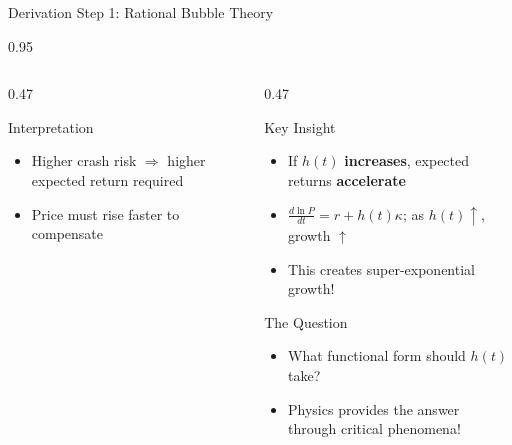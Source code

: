 \documentclass[9pt, aspectratio=169, t]{beamer}
\begin{document}
\begin{frame}{Derivation Step 1: Rational Bubble Theory}
\begin{cminipage}{0.95\textwidth}
{\begin{columns}[T]
\begin{column}{0.47\textwidth}
            \begin{exampleblock}{Interpretation}
                \begin{itemize}\setlength{\itemsep}{0pt}
                    \item Higher crash risk $\Rightarrow$ higher expected return required
                    \item Price must rise faster to compensate
                \end{itemize}
            \end{exampleblock}
        \end{column}
        \begin{column}{0.47\textwidth}
            \begin{alertblock}{Key Insight}
                \begin{itemize}\setlength{\itemsep}{0pt}
                    \item If $h(t)$ \textbf{increases}, expected returns \textbf{accelerate}
                    \item $\frac{d\ln P}{dt} = r + h(t)\kappa$; as $h(t) \uparrow$, growth $\uparrow$
                    \item This creates super-exponential growth!
                \end{itemize}
            \end{alertblock}

            \begin{block}{The Question}
                \begin{itemize}\setlength{\itemsep}{0pt}
                    \item What functional form should $h(t)$ take?
                    \item Physics provides the answer through critical phenomena!
                \end{itemize}
            \end{block}
        \end{column}
    \end{columns}
    }
    \end{cminipage}
\end{frame}
\end{document}
